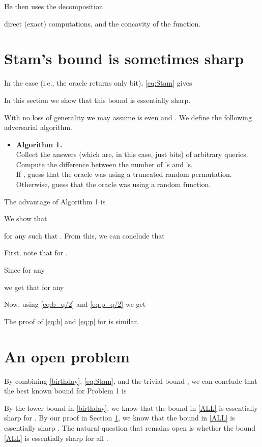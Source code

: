 \documentclass{llncs}
\numberwithin{equation}{section}
\numberwithin{lemma}{section}
\numberwithin{proposition}{section}
\begin{document}
He then uses the decomposition 

direct (exact) computations, and the concavity of the  function. 

\section{Stam's bound is sometimes sharp}\label{sec:Stam_sharp}
In the case  (i.e., the oracle returns only  bit), \eqref{eq:Stam} gives 

In this section we show that this bound is essentially sharp. 

With no loss of generality we may assume  is even and . We define the following adversarial algorithm. 

\begin{itemize}
\item []
{\bf Algorithm 1.} \\ 
Collect the answers (which are, in this case, just bits) of  arbitrary queries. \\ 
Compute the difference  between the number of 's and 's. \\
If  , guess that the oracle was using a truncated random permutation. Otherwise, guess that the oracle was using a random function.
\end{itemize}


The advantage of Algorithm 1 is

We show that 

for any  such that . From this, we can conclude that 


First, note that for .

Since for any 

we get that for any 


Now, using \eqref{eq:b_q/2} and \eqref{eq:p_q/2} we get

The proof of \eqref{eq:b} and \eqref{eq:p} for  is similar.

\section{An open problem}

By combining \eqref{birthday}, \eqref{eq:Stam}, and the trivial bound , we can conclude that the best known bound for Problem 1 is


\noindent
By the lower bound in \eqref{birthday}, we know that the bound in \eqref{ALL} is essentially sharp for . By our proof in Section \ref{sec:Stam_sharp}, we know that the bound in \eqref{ALL} is essentially sharp . The natural question that remains open is whether the bound \eqref{ALL} is essentially sharp for all .
\end{document}
